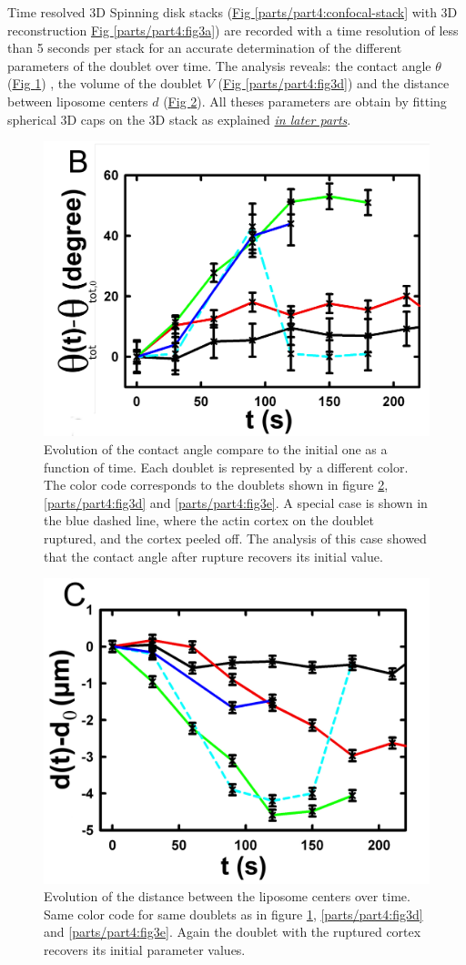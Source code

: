 \documentclass[A4paperpaper,11pt,english]{sphinxmanual}
\begin{document}
Time resolved 3D Spinning disk stacks (\hyperref[parts/part4:confocal-stack]{Fig  \ref*{parts/part4:confocal-stack}} with 3D reconstruction
\hyperref[parts/part4:fig3a]{Fig  \ref*{parts/part4:fig3a}}) are recorded with a time resolution of less than 5 seconds per stack for an accurate determination of the different
parameters of the doublet over time. The analysis reveals: the contact angle \(\theta\) (\hyperref[parts/part4:fig3b]{Fig  \ref*{parts/part4:fig3b}}) , the
volume of the doublet \(V\) (\hyperref[parts/part4:fig3d]{Fig  \ref*{parts/part4:fig3d}}) and the distance between liposome
centers \(d\) (\hyperref[parts/part4:fig3c]{Fig  \ref*{parts/part4:fig3c}}). All theses parameters are obtain by
fitting spherical 3D caps on the 3D stack as explained {\hyperref[parts/part4:full3dfit]{\emph{in later parts}}}.
\begin{figure}[htbp]
\centering
\capstart

\includegraphics[width=0.500\linewidth]{Fig_03-B.png}
\caption{Evolution of the contact angle compare to the initial one as a function of
time.  Each doublet is represented by a different color. The color code corresponds to the doublets
shown in figure \hyperref[parts/part4:fig3c]{ \ref*{parts/part4:fig3c}}, \hyperref[parts/part4:fig3d]{ \ref*{parts/part4:fig3d}}
and \hyperref[parts/part4:fig3e]{ \ref*{parts/part4:fig3e}}. A special case is shown in the blue dashed line,
where the actin cortex on the doublet ruptured, and the cortex peeled off.
The analysis of this case showed that the contact angle after rupture recovers its initial value.}\label{parts/part4:fig3b}\end{figure}
\begin{figure}[htbp]
\centering
\capstart

\includegraphics[width=0.500\linewidth]{Fig_03-C.png}
\caption{Evolution of the distance between the liposome centers over time.
Same color code for same doublets as in figure \hyperref[parts/part4:fig3b]{ \ref*{parts/part4:fig3b}}, \hyperref[parts/part4:fig3d]{ \ref*{parts/part4:fig3d}}
and \hyperref[parts/part4:fig3e]{ \ref*{parts/part4:fig3e}}. Again the doublet with the ruptured cortex recovers its initial parameter values.}\label{parts/part4:fig3c}\end{figure}
\end{document}
